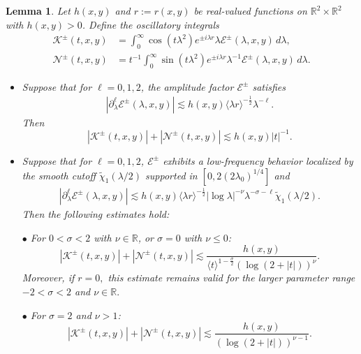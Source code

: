 \documentclass[10pt,a4paper]{amsart}
\newtheorem{lemma}{Lemma}
\begin{document}
\begin{lemma}\label{oscillatory}    Let \(h(x,y)\) and \(r:=r(x,y)\) be real-valued functions on \(\mathbb{R}^2 \times \mathbb{R}^2\) with \(h(x,y)>0\). Define the oscillatory integrals    
	\[
	\begin{aligned}
		\mathcal{K}^\pm(t,x,y) &= \int_0^{\infty} \cos (t \lambda^2)e^{\pm i\lambda r} \lambda \mathcal{E}^\pm(\lambda, x,y) \, d\lambda, \\
		\mathcal{N}^\pm(t,x,y) &= t^{-1}\int_0^{\infty} \sin(t\lambda^2) e^{\pm i\lambda r} \lambda^{-1} \mathcal{E}^\pm(\lambda, x,y) \, d\lambda.
	\end{aligned}
    \]  
	\begin{itemize}    
		\item[(i)] Suppose that for $\ell = 0, 1, 2$, the amplitude factor $\mathcal{E}^\pm$ satisfies    
		\begin{align}\label{condit 1}    
		\left| \partial_\lambda^{\ell} \mathcal{E}^\pm(\lambda, x,y) \right| \lesssim h(x, y) \langle \lambda r \rangle^{-\frac{1}{2}} \lambda^{-\ell}.    
		\end{align}    
		Then    
		\[    
		\left| \mathcal{K}^\pm(t,x,y) \right| + \left| \mathcal{N}^\pm(t,x,y) \right| \lesssim h(x, y) |t|^{-1}.    
		\]    
		
		\item[(ii)] Suppose that for $\ell = 0, 1, 2$, $\mathcal{E}^\pm$ exhibits a  low-frequency behavior localized by the smooth cutoff $\widetilde{\chi}_1(\lambda/2)$ supported in $[0, 2(2\lambda_0)^{1/4}]$ and    
		\begin{align}\label{condit 2}    
		\left| \partial_\lambda^{\ell} \mathcal{E}^\pm(\lambda, x,y) \right| \lesssim h(x, y) \langle \lambda r \rangle^{-\frac{1}{2}} |\log \lambda|^{-\nu} \lambda^{-\sigma - \ell} \widetilde{\chi}_1 (\lambda/2).    
		\end{align}    
		Then the following estimates hold:    
		
		$\bullet$ For $0 < \sigma < 2$ with $\nu \in \mathbb{R}$, or $\sigma = 0$ with $\nu \le 0$:    
		\[    
		\left| \mathcal{K}^\pm(t,x,y) \right| + \left| \mathcal{N}^\pm(t,x,y) \right| \lesssim \frac{h(x, y)}{\langle t \rangle^{1-\frac{\sigma}{2}} (\log(2+|t|))^{\nu}}.    
		\]    
Moreover, if $r=0,$  this estimate  remains
   valid for the larger parameter range
   $
   -2<\sigma<2$ and 
   $\nu\in\mathbb R.
   $		
		
        $\bullet$ For $\sigma = 2$ and $\nu > 1$:    
		\[    
		\left| \mathcal{K}^\pm(t,x,y) \right| + \left| \mathcal{N}^\pm(t,x,y) \right| \lesssim  \frac{h(x, y)}{\left(\log(2+|t|)\right)^{\nu-1}}.    
		\]    
	\end{itemize} 
\end{lemma}    
\end{document}
